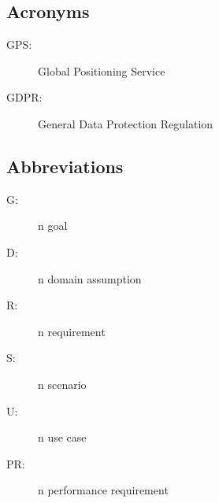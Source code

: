 \documentclass[../../rasd.tex]{subfiles}
\begin{document}
		\subsection{Acronyms}
		\begin{description}
		\item[GPS:]Global Positioning Service
		\item[GDPR:]General Data Protection Regulation
		\end{description}
		\subsection{Abbreviations}
		\begin{description}
			\item[G:]n goal
			\item[D:]n domain assumption
			\item[R:]n requirement
			\item[S:]n scenario
			\item[U:]n use case
			\item[PR:]n performance requirement
			
		\end{description}
		
\end{document}
